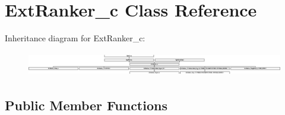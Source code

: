 \hypertarget{classExtRanker__c}{\section{Ext\-Ranker\-\_\-c Class Reference}
\label{classExtRanker__c}
}
Inheritance diagram for Ext\-Ranker\-\_\-c\-:\begin{figure}[H]
\begin{center}
\leavevmode
\includegraphics[height=1.083172cm]{classExtRanker__c}
\end{center}
\end{figure}
\subsection*{Public Member Functions}

